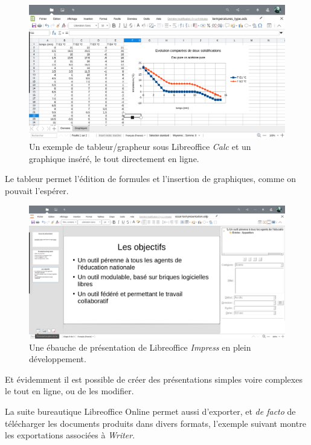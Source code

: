\begin{figure}
    \centering
    \includegraphics[]{Captures/nuage.lool.tableur.png}
    \caption{Un exemple de tableur/grapheur sous Libreoffice \emph{Calc\/} et un graphique inséré, le tout directement en ligne.}
\end{figure}

Le tableur permet l'édition de formules et l'insertion de graphiques, comme on pouvait l'espérer.

\begin{figure}
    \centering
    \includegraphics[]{Captures/nuage.lool.presentation.png}
    \caption{Une ébauche de présentation de Libreoffice \emph{Impress\/} en plein développement.}
\end{figure}

Et évidemment il est possible de créer des présentations simples voire complexes le tout en ligne, ou de les modifier.

La suite bureautique Libreoffice Online permet aussi d'exporter, et \emph{de facto} de télécharger les documents produits dans divers formats, l'exemple suivant montre les exportations associées à \emph{Writer\/}.

